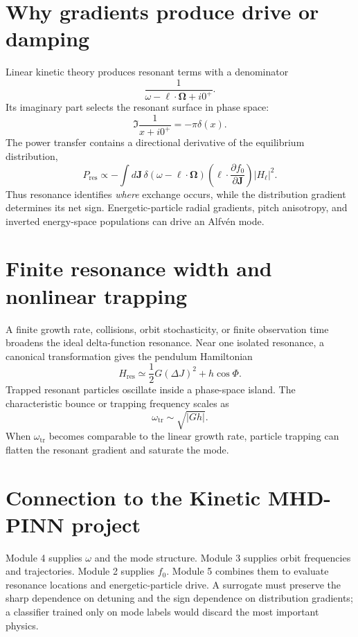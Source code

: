 \documentclass[11pt]{article}
\begin{document}
\section{Why gradients produce drive or damping}
Linear kinetic theory produces resonant terms with a denominator
\begin{equation}
\frac{1}{\omega-\boldsymbol\ell\cdot\boldsymbol\Omega+i0^+}.
\end{equation}
Its imaginary part selects the resonant surface in phase space:
\begin{equation}
\Im\frac{1}{x+i0^+}=-\pi\delta(x).
\end{equation}
The power transfer contains a directional derivative of the equilibrium distribution,
\begin{equation}
P_{\mathrm{res}}\propto-
\int d\mathbf J\,
\delta(\omega-\boldsymbol\ell\cdot\boldsymbol\Omega)
\left(\boldsymbol\ell\cdot\frac{\partial f_0}{\partial\mathbf J}\right)
|H_{\boldsymbol\ell}|^2.
\end{equation}
Thus resonance identifies \emph{where} exchange occurs, while the distribution gradient determines its net sign. Energetic-particle radial gradients, pitch anisotropy, and inverted energy-space populations can drive an Alfv\'en mode.

\section{Finite resonance width and nonlinear trapping}
A finite growth rate, collisions, orbit stochasticity, or finite observation time broadens the ideal delta-function resonance. Near one isolated resonance, a canonical transformation gives the pendulum Hamiltonian
\begin{equation}
H_{\mathrm{res}}\simeq\frac{1}{2}G(\Delta J)^2+h\cos\Phi.
\end{equation}
Trapped resonant particles oscillate inside a phase-space island. The characteristic bounce or trapping frequency scales as
\begin{equation}
\omega_{\mathrm{tr}}\sim\sqrt{|Gh|}.
\end{equation}
When $\omega_{\mathrm{tr}}$ becomes comparable to the linear growth rate, particle trapping can flatten the resonant gradient and saturate the mode.

\section{Connection to the Kinetic MHD-PINN project}
Module 4 supplies $\omega$ and the mode structure. Module 3 supplies orbit frequencies and trajectories. Module 2 supplies $f_0$. Module 5 combines them to evaluate resonance locations and energetic-particle drive. A surrogate must preserve the sharp dependence on detuning and the sign dependence on distribution gradients; a classifier trained only on mode labels would discard the most important physics.
\end{document}
